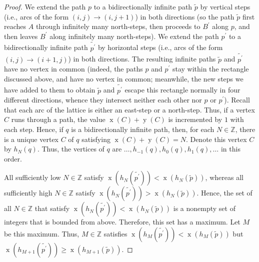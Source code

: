 \documentclass[reqno]{amsart}%
\newcommand{\0}{\phantom{c}}
\theoremstyle{plain}
\theoremstyle{definition}
\numberwithin{equation}{section}
\begin{document}
\begin{proof}
We extend the path $p$ to a bidirectionally infinite path $\widetilde{p}$ by
vertical steps (i.e., arcs of the form $\left(  i,j\right)  \rightarrow\left(
i,j+1\right)  $) in both directions (so the path $\widetilde{p}$ first reaches
$A$ through infinitely many north-steps, then proceeds to $B^{\prime}$ along
$p$, and then leaves $B^{\prime}$ along infinitely many north-steps). We
extend the path $p^{\prime}$ to a bidirectionally infinite path
$\widetilde{p^{\prime}}$ by horizontal steps (i.e., arcs of the form $\left(
i,j\right)  \rightarrow\left(  i+1,j\right)  $) in both directions. The
resulting infinite paths $\widetilde{p}$ and $\widetilde{p^{\prime}}$ have no
vertex in common (indeed, the paths $p$ and $p^{\prime}$ stay within the
rectangle discussed above, and have no vertex in common; meanwhile, the new
steps we have added to them to obtain $\widetilde{p}$ and
$\widetilde{p^{\prime}}$ escape this rectangle normally in four different
directions, whence they intersect neither each other nor $p$ or $p^{\prime}$).
Recall that each arc of the lattice is either an east-step or a north-step.
Thus, if a vertex $C$ runs through a path, the value $\operatorname*{x}\left(
C\right)  +\operatorname*{y}\left(  C\right)  $ is incremented by $1$ with
each step. Hence, if $q$ is a bidirectionally infinite path, then, for each
$N\in\mathbb{Z}$, there is a unique vertex $C$ of $q$ satisfying
$\operatorname*{x}\left(  C\right)  +\operatorname*{y}\left(  C\right)  =N$.
Denote this vertex $C$ by $h_{N}\left(  q\right)  $. Thus, the vertices of $q$
are $\ldots,h_{-1}\left(  q\right)  ,h_{0}\left(  q\right)  ,h_{1}\left(
q\right)  ,\ldots$ in this order.

All sufficiently low $N\in\mathbb{Z}$ satisfy $\operatorname*{x}\left(
h_{N}\left(  \widetilde{p^{\prime}}\right)  \right)  <\operatorname*{x}\left(
h_{N}\left(  \widetilde{p}\right)  \right)  $, whereas all sufficiently high
$N\in\mathbb{Z}$ satisfy $\operatorname*{x}\left(  h_{N}\left(
\widetilde{p^{\prime}}\right)  \right)  >\operatorname*{x}\left(  h_{N}\left(
\widetilde{p}\right)  \right)  $. Hence, the set of all $N\in\mathbb{Z}$ that
satisfy $\operatorname*{x}\left(  h_{N}\left(  \widetilde{p^{\prime}}\right)
\right)  <\operatorname*{x}\left(  h_{N}\left(  \widetilde{p}\right)  \right)
$ is a nonempty set of integers that is bounded from above. Therefore, this
set has a maximum. Let $M$ be this maximum. Thus, $M\in\mathbb{Z}$ satisfies
$\operatorname*{x}\left(  h_{M}\left(  \widetilde{p^{\prime}}\right)  \right)
<\operatorname*{x}\left(  h_{M}\left(  \widetilde{p}\right)  \right)  $ but
$\operatorname*{x}\left(  h_{M+1}\left(  \widetilde{p^{\prime}}\right)
\right)  \geq\operatorname*{x}\left(  h_{M+1}\left(  \widetilde{p}\right)
\right)  $.


\end{proof}
\end{document}
